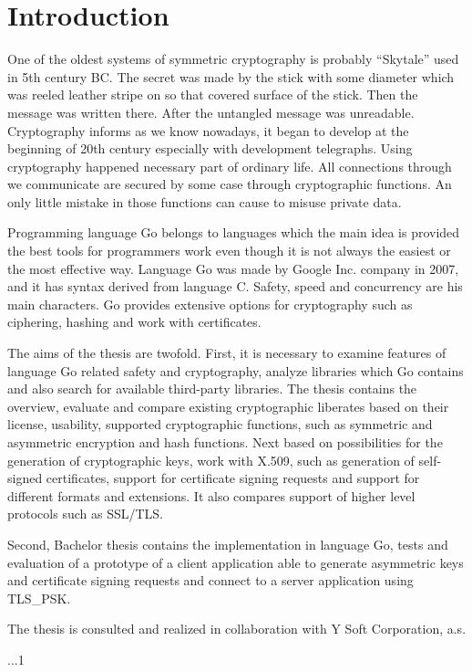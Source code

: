 \documentclass[
  twoside, 12pt, 
  printed, %
  notable,   %
  lof,     %
  lot,     %
]{fithesis3}
\begin{document}
\chapter{Introduction}
One of the oldest systems of symmetric cryptography is probably “Skytale” used in 5th century BC. 
The secret was made by the stick with some diameter which was reeled leather stripe on so that 
covered surface of the stick. Then the message was written there. After the untangled message was
unreadable. Cryptography informs as we know nowadays, it began to develop at the beginning of 20th 
century especially with development telegraphs. Using cryptography happened necessary part of 
ordinary life. All connections through we communicate are secured by some case through 
cryptographic functions. An only little mistake in those functions can cause to misuse private 
data. 
    
Programming language Go belongs to languages which the main idea is provided the best tools for programmers work even though it is not always the easiest or the most effective way. Language Go was made by Google Inc. company in 2007, and it has syntax derived from language C. Safety, speed 
and concurrency are his main characters. Go provides extensive options for cryptography such as ciphering, hashing and work with certificates. 

The aims of the thesis are twofold. First, it is necessary to examine features of language Go related safety and cryptography, analyze libraries which Go contains and also search for available third-party libraries. The thesis contains the overview, evaluate and compare existing cryptographic liberates based on their license, usability, supported cryptographic functions, such as symmetric and asymmetric encryption and hash functions. Next based on possibilities for the generation of cryptographic keys, work with X.509, such as generation of self-signed certificates, support for certificate signing requests and support for different formats and extensions.  It also compares support of higher level protocols such as SSL/TLS.    

Second, Bachelor thesis contains the implementation in language Go, tests and evaluation of a prototype of a client application able to generate asymmetric keys and certificate signing requests and connect to a server application using TLS\_PSK.

The thesis is consulted and realized in collaboration with Y Soft Corporation, a.s.

...1
\end{document}
